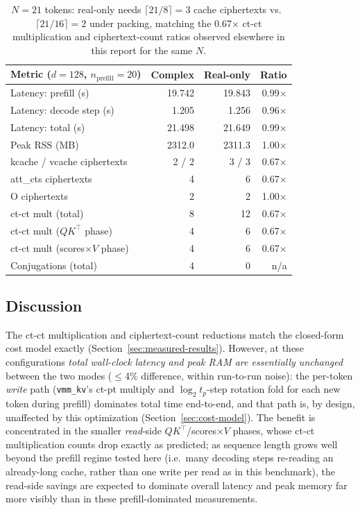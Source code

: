 \documentclass[11pt]{article}
\begin{document}
\begin{table}[H]
\centering
\small
\begin{tabular}{lrrr}
\toprule
Metric ($d{=}128$, $n_{\text{prefill}}{=}20$) & Complex & Real-only & Ratio \\
\midrule
Latency: prefill (s)     & 19.742  & 19.843  & 0.99$\times$ \\
Latency: decode step (s) & 1.205   & 1.256   & 0.96$\times$ \\
Latency: total (s)       & 21.498  & 21.649  & 0.99$\times$ \\
Peak RSS (MB)            & 2312.0  & 2311.3  & 1.00$\times$ \\
kcache / vcache ciphertexts & 2 / 2 & 3 / 3 & 0.67$\times$ \\
att\_cts ciphertexts        & 4     & 6     & 0.67$\times$ \\
O ciphertexts               & 2     & 2     & 1.00$\times$ \\
ct-ct mult (total)       & 8       & 12      & 0.67$\times$ \\
ct-ct mult ($QK^\top$ phase)     & 4 & 6 & 0.67$\times$ \\
ct-ct mult (scores$\times V$ phase) & 4 & 6 & 0.67$\times$ \\
Conjugations (total)     & 4       & 0       & n/a \\
\bottomrule
\end{tabular}
\caption{$N=21$ tokens: real-only needs $\lceil 21/8\rceil = 3$ cache
ciphertexts vs.\ $\lceil 21/16\rceil = 2$ under packing, matching the
0.67$\times$ ct-ct multiplication and ciphertext-count ratios observed
elsewhere in this report for the same $N$.}
\end{table}

\subsection{Discussion}
The ct-ct multiplication and ciphertext-count reductions match the
closed-form cost model exactly (Section~\ref{sec:measured-results}).
However, at these configurations \emph{total wall-clock latency and peak
RAM are essentially unchanged} between the two modes ($\le$4\% difference,
within run-to-run noise): the per-token \emph{write} path
(\texttt{vmm\_kv}'s ct-pt multiply and $\log_2 t_p$-step rotation fold for
each new token during prefill) dominates total time end-to-end, and that
path is, by design, unaffected by this optimization (Section~\ref{sec:cost-model}).
The benefit is concentrated in the smaller \emph{read}-side
$QK^\top$/scores$\times V$ phases, whose ct-ct multiplication counts drop
exactly as predicted; as sequence length grows well beyond the prefill
regime tested here (i.e.\ many decoding steps re-reading an already-long
cache, rather than one write per read as in this benchmark), the read-side
savings are expected to dominate overall latency and peak memory far more
visibly than in these prefill-dominated measurements.
\end{document}
